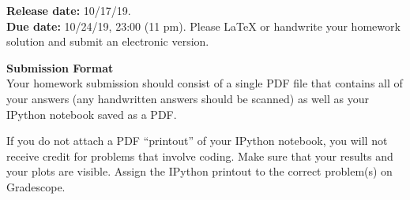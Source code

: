 

\def\title{Homework 7}

\newcommand{\qitem}{\qpart\item}

\renewcommand{\labelenumi}{(\alph{enumi})} %
\renewcommand{\theenumi}{(\alph{enumi})} %
\renewcommand{\labelenumii}{\roman{enumii}.} %
\renewcommand{\theenumii}{\roman{enumii}.}

\maketitle






\noindent
{\bf Release date:} 10/17/19.\\
{\bf Due date:}  10/24/19, 23:00 (11 pm). Please \LaTeX{} or handwrite your homework solution and submit an electronic version. 

\textbf{Submission Format} \\
Your homework submission should consist of a single PDF file that contains all of your answers (any handwritten answers should be scanned) as well as your IPython notebook saved as a PDF.
			
If you do not attach a PDF ``printout'' of your IPython notebook, you will not receive credit for problems that involve coding. Make sure that your results and your plots are visible. Assign the IPython printout to the correct problem(s) on Gradescope.

\begin{qunlist}

\newpage

\newpage

\newpage


\end{qunlist}

